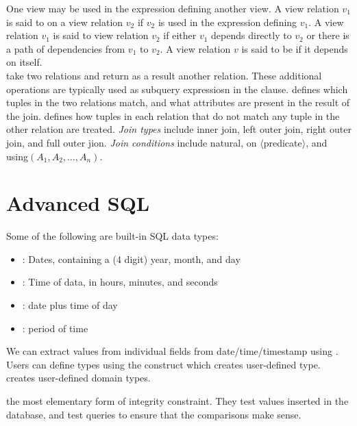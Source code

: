 \documentclass{article}
\begin{document}
One view may be used in the expression defining another view. A view relation $v_1$ is said to  on a view relation $v_2$ if $v_2$ is used in the expression defining $v_1$. A view relation $v_1$ is said to  view relation $v_2$ if either $v_1$ depends directly to $v_2$ or there is a path of dependencies from $v_1$ to $v_2$. A view relation $v$ is said to be  if it depends on itself. \\

 take two relations and return as a result another relation. These additional operations are typically used as subquery expressiosn in the  clause.  defines which tuples in the two relations match, and what attributes are present in the result of the join.  defines how tuples in each relation that do not match any tuple in the other relation are treated. \emph{Join types} include inner join, left outer join, right outer join, and full outer jion. \emph{Join conditions} include natural, on $\langle$predicate$\rangle$, and using$(A_1 , A_2 , \dots , A_n)$. 

\section{Advanced SQL}

\begin{definition}
  Some of the following are built-in SQL data types: 
  \begin{itemize}
    \item {}: Dates, containing a (4 digit) year, month, and day 
    \item {}: Time of data, in hours, minutes, and seconds 
    \item {}: date plus time of day 
    \item {}: period of time 
  \end{itemize}
\end{definition}

We can extract values from individual fields from date/time/timestamp using . Users can define types using the  construct which creates user-defined type.  creates user-defined domain types. 
 
\begin{definition}
  the most elementary form of integrity constraint. They test values inserted in the database, and test queries to ensure that the comparisons make sense. 
\end{definition}
\end{document}

